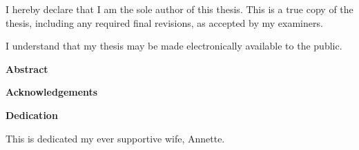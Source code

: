 \cleardoublepage %
 


  \noindent
I hereby declare that I am the sole author of this thesis. This is a true copy of the thesis, including any required final revisions, as accepted by my examiners.

  \bigskip
  
  \noindent
I understand that my thesis may be made electronically available to the public.

\cleardoublepage


\begin{center}\textbf{Abstract}\end{center}
	


\cleardoublepage


\begin{center}\textbf{Acknowledgements}\end{center}

	

\cleardoublepage
\newpage


\begin{center}\textbf{Dedication}\end{center}

This is dedicated my ever supportive wife, Annette.
\cleardoublepage

\renewcommand\contentsname{Table of Contents}
\tableofcontents
\cleardoublepage
{}

\listoftables
\cleardoublepage
{}		%

\listoffigures
\cleardoublepage
{}		%



